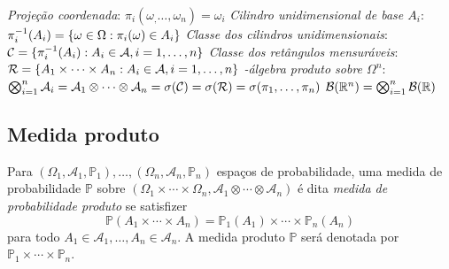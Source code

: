 \begin{definition}
	\leavevmode
	\begin{outline}[enumerate]
		\1 \textit{Projeção coordenada}: \(\pi_i(\omega_, \ldots, \omega_n) = \omega_i \)
		\1 \textit{Cilindro unidimensional de base $A_i$}: \( \pi_i^{-1}(A_i) = \{ \omega\in\Omega : \pi_i(\omega)\in A_i\} \) 
		\1 \textit{Classe dos cilindros unidimensionais}: \( \mathcal{C} = \{\pi_i^{-1}(A_i) : A_i \in \mathcal{A}, i=1,\ldots,n\}\)
		\1 \textit{Classe dos retângulos mensuráveis}: \( \mathcal{R} = \{A_1\times\cdots\times A_n : A_i \in \mathcal{A}, i=1,\ldots,n\}\)
		\1 \textit{\sig-álgebra produto sobre $\Omega^n$}: 
		\(\bigotimes_{i=1}^n \mathcal{A}_i = \mathcal{A}_1 \otimes \cdots \otimes \mathcal{A}_n = \sigma(\mathcal{C}) = \sigma(\mathcal{R}) = \sigma(\pi_1, \ldots,\pi_n)\)
		\1 \( \mathcal{B}(\mathbb{R}^n) = \bigotimes_{i=1}^n \mathcal{B}(\mathbb{R})\)
	\end{outline}
\end{definition}

\subsection{Medida produto}

\begin{definition}
	Para $(\Omega_1, \mathcal{A}_1, \mathbb{P}_1), \ldots, (\Omega_n, \mathcal{A}_n, \mathbb{P}_n)$ espaços de probabilidade, uma medida de probabilidade $\mathbb{P}$ sobre $(\Omega_1 \times \cdots \times \Omega_n, \mathcal{A}_1 \otimes \cdots \otimes \mathcal{A}_n)$ é dita \textit{medida de probabilidade produto} se satisfizer
	\begin{equation}
		\mathbb{P}(A_1 \times \cdots \times A_n) = \mathbb{P}_1(A_1) \times \cdots \times \mathbb{P}_n(A_n)
	\end{equation}
	para todo $A_1 \in \mathcal{A}_1, \ldots, A_n \in \mathcal{A}_n$. A medida produto $\mathbb{P}$ será denotada por $\mathbb{P}_1 \times \cdots \times \mathbb{P}_n$.
\end{definition}


